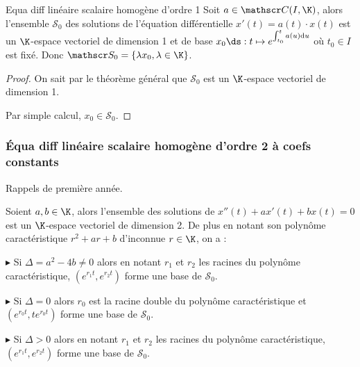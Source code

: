 
\begin{theoreme}{Equa diff linéaire scalaire homogène d'ordre 1}{}
    Soit $a \in \mathscr C (I, \K)$, alors l'ensemble $\mathscr S_0$ des solutions de l'équation différentielle  
    ${x'(t) = a(t) \cdot x(t)}$ est un $\K$-espace vectoriel de dimension 1 et de 
    base $x_0 \ds : t \mapsto e^{\int_{t_0}^{t} a(u) \mathrm d u}$ où 
    $t_0 \in I$ est fixé. Donc $\mathscr S_0 = \{ \lambda x_0, \lambda \in \K \}$.
\end{theoreme}

\begin{proof}
    On sait par le théorème général que $\mathscr S_0$ est un $\K$-espace vectoriel de dimension 1. 

    Par simple calcul, $x_0 \in \mathscr S_0$.
\end{proof}

\subsubsection{\'Equa diff linéaire scalaire homogène d'ordre 2 à coefs constants}

Rappels de première année. 

Soient $a, b \in \K$, alors l'ensemble des solutions de $x''(t) + ax'(t) +bx(t) = 0$ est 
un $\K$-espace vectoriel de dimension 2. De plus en notant son polynôme 
caractéristique $r^2 + ar + b$ d'inconnue $r \in \K$, on a : 


\svspace $\blacktriangleright$ Si $\Delta = a^2 - 4b \neq 0$ alors en notant $r_1$ et $r_2$ les racines 
du polynôme caractéristique, $(e^{r_1 t}, e^{r_2 t})$ forme une base de $\mathscr S_0$.

$\blacktriangleright$ Si $\Delta = 0$ alors $r_0$ est la racine double du polynôme caractéristique et $(e^{r_0 t}, te^{r_0 t})$ forme une base de $\mathscr S_0$.


\svspace $\blacktriangleright$ Si $\Delta > 0$ alors en notant $r_1$ et $r_2$ les racines du polynôme caractéristique, $(e^{r_1 t}, e^{r_2 t})$ forme une base de $\mathscr S_0$.

